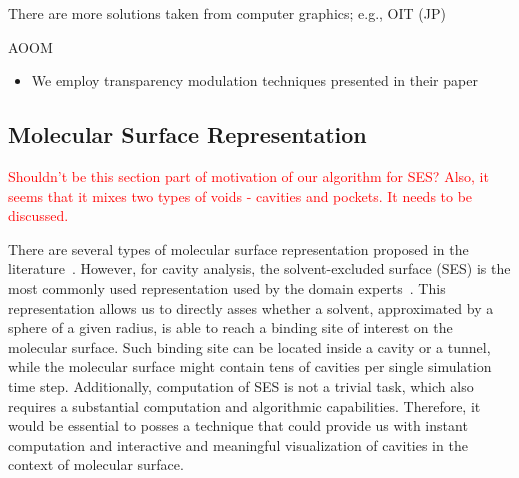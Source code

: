 There are more solutions taken from computer graphics; e.g., OIT (JP)

AOOM
\begin{itemize}
  \item We employ transparency modulation techniques presented in their paper \cite{borland2011ambient}
\end{itemize}

\subsection{Molecular Surface Representation}
\textcolor{red}{Shouldn't be this section part of motivation of our algorithm for SES? Also, it seems that it mixes two types of voids - cavities and pockets. It needs to be discussed.}

There are several types of molecular surface representation proposed in the literature~\cite{STAR2015}. 
However, for cavity analysis,  the solvent-excluded surface (SES) is the most commonly used representation used by the domain experts~\cite{todo}. 
This representation allows us to directly asses whether a solvent, approximated by a sphere of a given radius, is able to reach a binding site of interest on the molecular surface. 
Such binding site can be located inside a cavity or a tunnel, while the molecular surface might contain tens of cavities per single simulation time step. 
Additionally, computation of SES is not a trivial task, which also requires a substantial computation and algorithmic capabilities. 
Therefore, it would be essential to posses a technique that could provide us with instant computation and interactive and meaningful visualization of cavities in the context of molecular surface.


